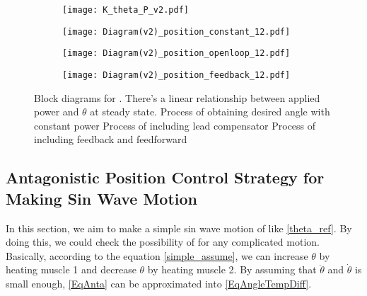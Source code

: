 \begin{figure}[b]
	\centering
	\begin{minipage}{0.3\textwidth}
		\begin{subfigure}{\linewidth}
			\centering
			\texttt{[image: K\_theta\_P\_v2.pdf]}
			\caption{\label{KthetaP}}
		\end{subfigure}
	\end{minipage}%
	\begin{minipage}{0.65\textwidth}
		\begin{subfigure}{\linewidth}
			\texttt{[image: Diagram(v2)\_position\_constant\_12.pdf]}
			\caption{\label{AntaControl_constant}}
		\end{subfigure}
		
		\begin{subfigure}{\linewidth}
			\texttt{[image: Diagram(v2)\_position\_openloop\_12.pdf]}
			\caption{\label{position_open_loop}}
		\end{subfigure}
		
		\begin{subfigure}{\linewidth}
			\texttt{[image: Diagram(v2)\_position\_feedback\_12.pdf]}
			\caption{\label{position_closed_loop}}
		\end{subfigure}
	\end{minipage}
	\caption[Block Diagrams for \APC]{Block diagrams for \apc. There's a linear relationship between applied power and $\theta$ at steady state.   Process of obtaining desired angle with constant power  Process of \apc including lead compensator  Process of \apc including feedback and feedforward}
	\label{anta_position_diagrams}
\end{figure}


\subsection{Antagonistic Position Control Strategy for Making Sin Wave Motion}
In this section, we aim to make a simple sin wave motion of \anta like \eqref{theta_ref}. By doing this, we could check the possibility of \apc for any complicated motion. Basically, according to the equation \eqref{simple_assume}, we can increase $\theta$ by heating muscle 1 and decrease $\theta$ by heating muscle 2. 
By assuming that $\ddot{\theta}$ and $\dot{\theta}$ is small enough, \eqref{EqAnta} can be approximated into \eqref{EqAngleTempDiff}.

